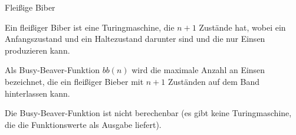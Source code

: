 \begin{frame}{Fleißige Biber}
	\begin{Definition}
		Ein fleißiger Biber ist eine Turingmaschine, die $n+1$ Zustände hat, wobei ein Anfangszustand und ein Haltezustand darunter sind und die nur Einsen produzieren kann.
	\end{Definition}
	\pause

	\begin{Definition}
		Als Busy-Beaver-Funktion $bb(n)$ wird die maximale Anzahl an Einsen bezeichnet, die ein fleißiger Bieber mit $n+1$ Zuständen auf dem Band hinterlassen kann.
	\end{Definition} 

	\begin{Satz}
		Die Busy-Beaver-Funktion ist nicht berechenbar (es gibt keine Turingmaschine, die die Funktionswerte als Ausgabe liefert).
	\end{Satz}
\end{frame}

